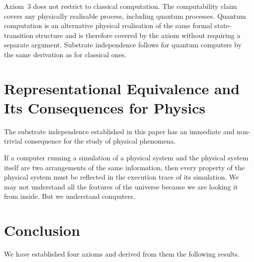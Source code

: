\documentclass[11pt]{article}
\begin{document}
Axiom~3 does not restrict to classical computation. The computability claim
covers any physically realisable process, including quantum processes.
Quantum computation is an alternative physical realisation of the same
formal state-transition structure and is therefore covered by the axiom
without requiring a separate argument. Substrate independence follows for
quantum computers by the same derivation as for classical ones.

\section{Representational Equivalence and Its Consequences for Physics}
\label{sec:consequences}

The substrate independence established in this paper has an immediate and
non-trivial consequence for the study of physical phenomena.

If a computer running a simulation of a physical system and the physical
system itself are two arrangements of the same information, then every
property of the physical system must be reflected in the execution trace of
its simulation. We may not understand all the features of the universe
because we are looking it from inside. But we understand computers.


\section{Conclusion}
\label{sec:conclusion}

We have established four axioms and derived from them the following results.
\end{document}
